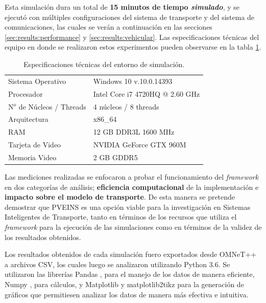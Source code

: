 Esta simulación dura un total de \textbf{15 minutos de tiempo \emph{simulado}}, y se ejecutó con múltiples configuraciones del sistema de transporte y del sistema de comunicaciones, las cuales se verán a continuación en las secciones \ref{sec:results:performance} y \ref{sec:results:vehicular}. Las especificaciones técnicas del equipo en donde se realizaron estos experimentos pueden observarse en la tabla \ref{table:systemspecs}.

\begin{table}[tpb]
    \centering
    \begin{tabular}{@{}ll@{}}
        \toprule
        Sistema Operativo     & Windows 10 v.10.0.14393         \\
        Procesador            & Intel Core i7 4720HQ @ 2.60 GHz \\
        N$^{o}$ de Núcleos / Threads & 4 núcleos / 8 threads\\
        Arquitectura          & x86\_64                         \\
        RAM                   & 12 GB DDR3L 1600 MHz            \\
        Tarjeta de Video      & NVIDIA GeForce GTX 960M         \\
        Memoria Video         & 2 GB GDDR5                      \\ \bottomrule
    \end{tabular}
    \caption{Especificaciones técnicas del entorno de simulación.}
    \label{table:systemspecs}
\end{table}

Las mediciones realizadas se enfocaron a probar el funcionamiento del \emph{framework} en dos categorías de análisis; \textbf{eficiencia computacional} de la implementación e \textbf{impacto sobre el modelo de transporte}. De esta manera se pretende demostrar que PVEINS es una opción viable para la investigación en Sistemas Inteligentes de Transporte, tanto en términos de los recursos que utiliza el \emph{framework} para la ejecución de las simulaciones como en términos de la validez de los resultados obtenidos.

Los resultados obtenidos de cada simulación fuero exportados desde OMNeT++ a archivos CSV, los cuales luego se analizaron utilizando Python 3.6.
Se utilizaron las librerías Pandas \autocite{pandas}, para el manejo de los datos de manera eficiente, Numpy \autocite{numpy}, para cálculos, y Matplotlib \autocite{matplotlib} y matplotlib2tikz \autocite{matplotlib2tikz} para la generación de gráficos que permitiesen analizar los datos de manera más efectiva e intuitiva.


